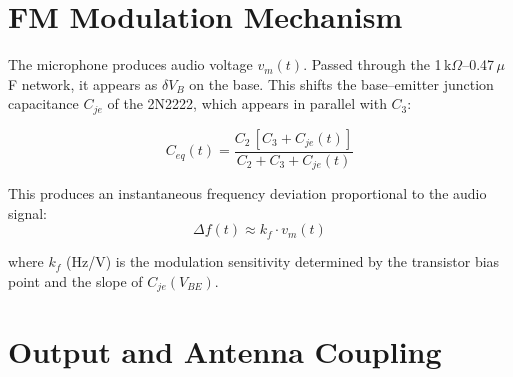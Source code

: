 \documentclass[10pt, twocolumn]{article}
\begin{document}



\section{FM Modulation Mechanism}

The microphone produces audio voltage $v_m(t)$. Passed through the
1\,k$\Omega$--0.47\,$\mu$F network, it appears as $\delta V_B$ on the base.
This shifts the base--emitter junction capacitance $C_{je}$ of the 2N2222,
which appears in parallel with $C_3$:

\begin{equation}
  C_{eq}(t) = \frac{C_2\,[C_3 + C_{je}(t)]}{C_2 + C_3 + C_{je}(t)}
\end{equation}

This produces an instantaneous frequency deviation proportional to the
audio signal:
\begin{equation}
  \Delta f(t) \approx k_f \cdot v_m(t)
\end{equation}

where $k_f$ (Hz/V) is the modulation sensitivity determined by the transistor
bias point and the slope of $C_{je}(V_{BE})$.

\section{Output and Antenna Coupling}
\end{document}
